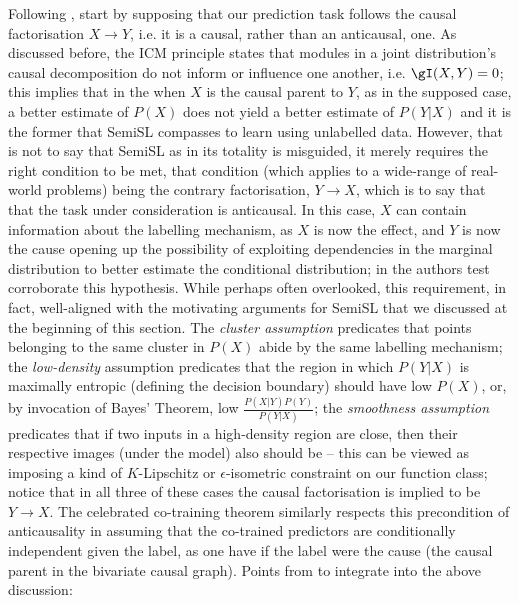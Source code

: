 Following \cite{scholkopf2021toward}, start by supposing that our prediction task follows the
causal factorisation \( X \to Y\), i.e. it is a causal, rather than an anticausal, one.
%
As discussed before, the ICM principle states that modules in a joint distribution's causal
decomposition do not inform or influence one another, i.e. \(\gI(X, Y) = 0 \); this implies that in
the when \(X\) is the causal parent to \(Y\), as in the supposed case, a better estimate of
\(P(X)\) does not yield a better estimate of \(P(Y|X)\) and it is the former that SemiSL
compasses to learn using unlabelled data.
%
However, that is not to say that SemiSL as in its totality is misguided, it merely requires the
right condition to be met, that condition (which applies to a wide-range of real-world problems)
being the contrary factorisation, \(Y \to X \), which is to say that that the task under
consideration is anticausal.
%
In this case, \(X\) can contain information about the labelling mechanism, as \(X\) is now the
effect, and \(Y\) is now the cause opening up the possibility of exploiting dependencies in the
marginal distribution to better estimate the conditional distribution; in
\cite{scholkopf2012causal} the authors test corroborate this hypothesis.
%
While perhaps often overlooked, this requirement, in fact, well-aligned with the motivating
arguments for SemiSL that we discussed at the beginning of this section.
%
The \emph{cluster assumption} predicates that points belonging to the same cluster in \(P(X)\)
abide by the same labelling mechanism; 
%
the \emph{low-density} assumption predicates that the region in which \(P(Y|X)\) is maximally
entropic (defining the decision boundary) should have low \(P(X)\), or, by invocation of Bayes'
Theorem, low \( \frac{ P(X|Y)P(Y) }{ P(Y|X) } \); 
%
the \emph{smoothness assumption} predicates that if two inputs in a high-density region are close,
then their respective images (under the model) also should be -- this can be viewed as imposing a
kind of \(K\)-Lipschitz or \(\epsilon\)-isometric constraint on our function class;
%
notice that in all three of these cases the causal factorisation is implied to be \(Y \to X \).
%
The celebrated co-training theorem \citep{blum1998combining} similarly respects this precondition
of anticausality in assuming that the co-trained predictors are conditionally independent given the
label, as one have if the label were the cause (the causal parent in the bivariate causal graph).
%
Points from \cite{castro2020causality} to integrate into the above discussion:
